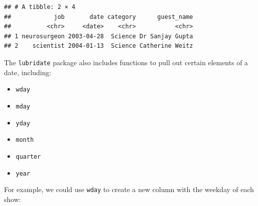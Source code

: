 \documentclass[]{book}
\makeatletter
\newenvironment{Shaded}{\begin{snugshade}}{\end{snugshade}}
\newcommand{\KeywordTok}[1]{\textcolor[rgb]{0.13,0.29,0.53}{\textbf{{#1}}}}
\newcommand{\DataTypeTok}[1]{\textcolor[rgb]{0.13,0.29,0.53}{{#1}}}
\newcommand{\DecValTok}[1]{\textcolor[rgb]{0.00,0.00,0.81}{{#1}}}
\newcommand{\StringTok}[1]{\textcolor[rgb]{0.31,0.60,0.02}{{#1}}}
\newcommand{\OtherTok}[1]{\textcolor[rgb]{0.56,0.35,0.01}{{#1}}}
\newcommand{\NormalTok}[1]{{#1}}
\providecommand{\tightlist}{%
  \setlength{\itemsep}{0pt}\setlength{\parskip}{0pt}}
\newenvironment{kframe}{%
\medskip{}
\setlength{\fboxsep}{.8em}
 \def\at@end@of@kframe{}%
 \ifinner\ifhmode%
  \def\at@end@of@kframe{\end{minipage}}%
  \begin{minipage}{\columnwidth}%
 \fi\fi%
 \def\FrameCommand##1{\hskip\@totalleftmargin \hskip-\fboxsep
 \colorbox{shadecolor}{##1}\hskip-\fboxsep
     \hskip-\linewidth \hskip-\@totalleftmargin \hskip\columnwidth}%
 \MakeFramed {\advance\hsize-\width
   \@totalleftmargin\z@ \linewidth\hsize
   \@setminipage}}%
 {\par\unskip\endMakeFramed%
 \at@end@of@kframe}
\renewenvironment{Shaded}{\begin{kframe}}{\end{kframe}}
\makeatother
\begin{document}
\begin{Shaded}
\end{Shaded}

\begin{verbatim}
## # A tibble: 2 × 4
##            job       date category      guest_name
##          <chr>     <date>    <chr>           <chr>
## 1 neurosurgeon 2003-04-28  Science Dr Sanjay Gupta
## 2    scientist 2004-01-13  Science Catherine Weitz
\end{verbatim}

The \texttt{lubridate} package also includes functions to pull out
certain elements of a date, including:

\begin{itemize}
\tightlist
\item
  \texttt{wday}
\item
  \texttt{mday}
\item
  \texttt{yday}
\item
  \texttt{month}
\item
  \texttt{quarter}
\item
  \texttt{year}
\end{itemize}

For example, we could use \texttt{wday} to create a new column with the
weekday of each show:

\begin{Shaded}
\end{Shaded}
\end{document}
